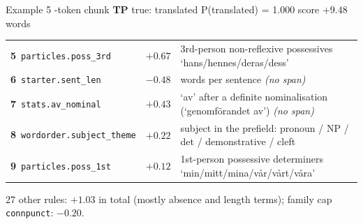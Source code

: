 \begin{exbox}[]{Example 5 -token chunk \quad \textbf{TP} \quad true: translated \quad P(translated) = 1.000 \quad score $+9.48$  words}
{\begin{tabularx}{\linewidth}{@{}l r X@{}}
\textbf{5}~\texttt{particles.poss\_3rd} & $+0.67$ & 3rd-person non-reflexive possessives `hans/hennes/deras/dess' \\
\textbf{6}~\texttt{starter.sent\_len} & $-0.48$ & words per sentence \textit{(no span)} \\
\textbf{7}~\texttt{stats.av\_nominal} & $+0.43$ & `av' after a definite nominalisation (`genomförandet av') \textit{(no span)} \\
\textbf{8}~\texttt{wordorder.subject\_theme} & $+0.22$ & subject in the prefield: pronoun / NP / det / demonstrative / cleft \\
\textbf{9}~\texttt{particles.poss\_1st} & $+0.12$ & 1st-person possessive determiners `min/mitt/mina/vår/vårt/våra' \\
\end{tabularx}
\par 27 other rules: $+1.03$ in total (mostly absence and length terms); family cap \texttt{connpunct}: $-0.20$.}
\par{}
\end{exbox}

